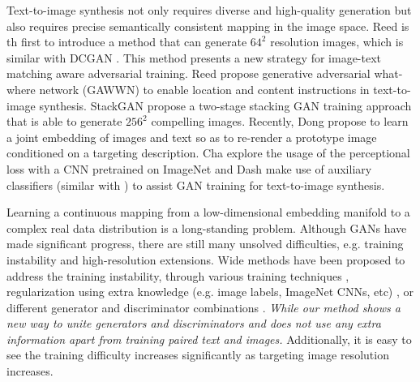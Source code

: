 \documentclass[10pt,twocolumn,letterpaper]{article}
\begin{document}
Text-to-image synthesis not only requires diverse and high-quality generation but also requires precise semantically consistent mapping in the image space.  Reed \etal \cite{reed2016generative}  is th first to introduce a method that can generate $64^2$ resolution images, which is similar with DCGAN \cite{radford2015unsupervised}. This method presents a new strategy for image-text matching aware adversarial training. Reed \etal \cite{reed2016learning} propose generative
adversarial what-where network (GAWWN) to enable location and content instructions in text-to-image synthesis. StackGAN \etal \cite{han2017stackgan} propose a two-stage stacking GAN training approach that is able to generate $256^2$ compelling images. Recently, Dong \etal \cite{dong2017semantic} propose to learn a joint embedding of images and text so as to re-render a prototype image conditioned on a targeting description. Cha \etal \cite{char2017perceptual} explore the usage of the perceptional loss with a CNN pretrained on ImageNet \cite{johnson2016perceptual} and Dash \etal \cite{dash2017tac} make use of auxiliary classifiers (similar with \cite{odena2016conditional}) to assist GAN training for text-to-image synthesis. 
	
Learning a continuous mapping from a low-dimensional embedding manifold to a complex real data distribution is a long-standing problem. Although GANs have made significant progress, there are still many unsolved difficulties, e.g. training instability and high-resolution extensions. Wide methods have been proposed to address the training instability, through various training techniques \cite{salimans2016improved,arjovsky2017wasserstein,berthelot2017began,shrivastava2016learning,odena2016conditional}, regularization using extra knowledge (e.g. image labels, ImageNet CNNs, etc) \cite{dosovitskiy2016generating,ledig2016photo,dash2017tac,dash2017tac}, or different generator and discriminator combinations  \cite{metz2016unrolled,durugkar2016generative,yang2017lr,huang2016stacked}. \textit{While our method shows a new way to unite generators and discriminators and does not use any extra information apart from training paired text and images.} Additionally, it is easy to see the training difficulty increases significantly as targeting image resolution increases.

\end{document}
